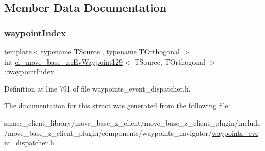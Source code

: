 \subsection{Member Data Documentation}
\mbox{\label{structcl__move__base__z_1_1EvWaypoint129_af41f02bb4065061654a521d88b1f459e}} 
\subsubsection{\texorpdfstring{waypoint\+Index}{waypointIndex}}
{\footnotesize\ttfamily template$<$typename T\+Source , typename T\+Orthogonal $>$ \\
int \hyperlink{structcl__move__base__z_1_1EvWaypoint129}{cl\+\_\+move\+\_\+base\+\_\+z\+::\+Ev\+Waypoint129}$<$ T\+Source, T\+Orthogonal $>$\+::waypoint\+Index}



Definition at line 791 of file waypoints\+\_\+event\+\_\+dispatcher.\+h.



The documentation for this struct was generated from the following file\+:\begin{DoxyCompactItemize}
\item 
smacc\+\_\+client\+\_\+library/move\+\_\+base\+\_\+z\+\_\+client/move\+\_\+base\+\_\+z\+\_\+client\+\_\+plugin/include/move\+\_\+base\+\_\+z\+\_\+client\+\_\+plugin/components/waypoints\+\_\+navigator/\hyperlink{waypoints__event__dispatcher_8h}{waypoints\+\_\+event\+\_\+dispatcher.\+h}\end{DoxyCompactItemize}
